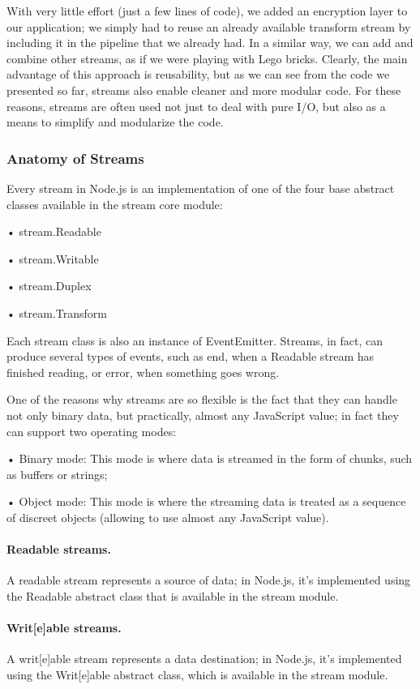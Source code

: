 \documentclass{llncs}
\begin{document}
With very little effort (just a few lines of code), we added an encryption layer to our application; we simply had to reuse an already available transform stream by including it in the pipeline that we already had. 
In a similar way, we can add and combine other streams, as if we were playing with Lego bricks.
Clearly, the main advantage of this approach is reusability, but as we can see from the code we presented so far, streams also enable cleaner and more modular code. 
For these reasons, streams are often used not just to deal with pure I/O, but also as a means to simplify and modularize the code.

\subsubsection{Anatomy of Streams}
Every stream in Node.js is an implementation of one of the four base abstract classes available in the stream core module:

• stream.Readable

• stream.Writable

• stream.Duplex

• stream.Transform

Each stream class is also an instance of EventEmitter. 
Streams, in fact, can produce several types of events, such as end, when a Readable stream has finished reading, or error, when something goes wrong.

One of the reasons why streams are so flexible is the fact that they can handle not only binary data, but practically, almost any JavaScript value; in fact they can support two operating modes:

• Binary mode: This mode is where data is streamed in the form of chunks, such as buffers or strings;

• Object mode: This mode is where the streaming data is treated as a sequence of discreet objects (allowing to use almost any JavaScript value).

\paragraph{Readable streams.}
A readable stream represents a source of data; in Node.js, it's implemented using the Readable abstract class that is available in the stream module.

\paragraph{Writ[e]able streams.}
A writ[e]able stream represents a data destination; in Node.js, it's implemented using the Writ[e]able abstract class, which is available in the stream module.
\end{document}
